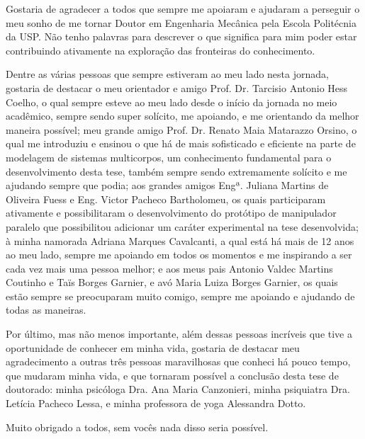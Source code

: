 \documentclass[]{politex}
\begin{document}
\begin{agradecimentos}

Gostaria de agradecer a todos que sempre me apoiaram e ajudaram a perseguir o meu sonho de me tornar Doutor em Engenharia Mecânica pela Escola Politécnia da USP. Não tenho palavras para descrever o que significa para mim poder estar contribuindo ativamente na exploração das fronteiras do conhecimento.

Dentre as várias pessoas que sempre estiveram ao meu lado nesta jornada, gostaria de destacar o meu orientador e amigo Prof. Dr. Tarcisio Antonio Hess Coelho, o qual sempre esteve ao meu lado desde o início da jornada no meio acadêmico, sempre sendo super solícito, me apoiando, e me orientando da melhor maneira possível; meu grande amigo Prof. Dr. Renato Maia Matarazzo Orsino, o qual me introduziu e ensinou o que há de mais sofisticado e eficiente na parte de modelagem de sistemas multicorpos, um conhecimento fundamental para o desenvolvimento desta tese, também sempre sendo extremamente solícito e me ajudando sempre que podia; aos grandes amigos Engª. Juliana Martins de Oliveira Fuess e Eng. Victor Pacheco Bartholomeu, os quais participaram ativamente e possibilitaram o desenvolvimento do protótipo de manipulador paralelo que possibilitou adicionar um caráter experimental na tese desenvolvida; à minha namorada Adriana Marques Cavalcanti, a qual está há mais de 12 anos ao meu lado, sempre me apoiando em todos os momentos e me inspirando a ser cada vez mais uma pessoa melhor; e aos meus pais Antonio Valdec Martins Coutinho e Taïs Borges Garnier, e avó Maria Luiza Borges Garnier, os quais estão sempre se preocuparam muito comigo, sempre me apoiando e ajudando de todas as maneiras.

Por último, mas não menos importante, além dessas pessoas incríveis que tive a oportunidade de conhecer em minha vida, gostaria de destacar meu agradecimento a outras três pessoas maravilhosas que conheci há pouco tempo, que mudaram minha vida, e que tornaram possível a conclusão desta tese de doutorado: minha psicóloga Dra. Ana Maria Canzonieri, minha psiquiatra Dra. Letícia Pacheco Lessa, e minha professora de yoga Alessandra Dotto.

Muito obrigado a todos, sem vocês nada disso seria possível.

\end{agradecimentos}
\end{document}
